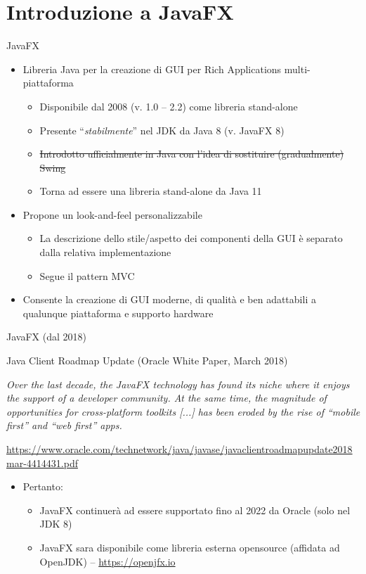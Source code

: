 \documentclass[presentation]{beamer}
\begin{document}
\section{Introduzione a JavaFX}

\begin{frame}{JavaFX}
\begin{itemize}\itemsep20pt
\item Libreria Java per la creazione di GUI per Rich Applications multi-piattaforma
\begin{itemize}
\item Disponibile dal 2008 (v. 1.0 -- 2.2) come libreria stand-alone
\item Presente ``\emph{stabilmente}'' nel JDK da Java 8 (v. JavaFX 8)
\item \st{Introdotto ufficialmente in Java con l'idea di sostituire (gradualmente) Swing}
\item Torna ad essere una libreria stand-alone da Java 11
\end{itemize}
\item Propone un look-and-feel personalizzabile
\begin{itemize}
\item La descrizione dello stile/aspetto dei componenti della GUI è separato dalla relativa implementazione
\item Segue il pattern MVC
\end{itemize}
\item Consente la creazione di GUI moderne, di qualità e ben adattabili a qualunque piattaforma e supporto hardware
\end{itemize}
\end{frame}

\begin{frame}{JavaFX (dal 2018)}

\begin{block}{Java Client Roadmap Update (Oracle White Paper, March 2018)}
\begin{small}
\begin{center}
\emph{Over the last decade, the JavaFX technology has found its niche where it enjoys the support of a developer community. At the same time, the magnitude of opportunities for cross-platform toolkits [...] has been eroded by the rise of ``mobile first'' and ``web first'' apps.}
\begin{tiny}
\url{https://www.oracle.com/technetwork/java/javase/javaclientroadmapupdate2018mar-4414431.pdf}
\end{tiny}
\end{center}
\end{small}
\end{block}
%
\begin{itemize}
\item Pertanto:
\begin{itemize}
\item JavaFX continuerà ad essere supportato fino al 2022 da Oracle (solo nel JDK 8)
\item JavaFX sara disponibile come libreria esterna opensource (affidata ad OpenJDK) -- \url{https://openjfx.io}
\end{itemize}
\end{itemize}
\end{frame}
\end{document}
